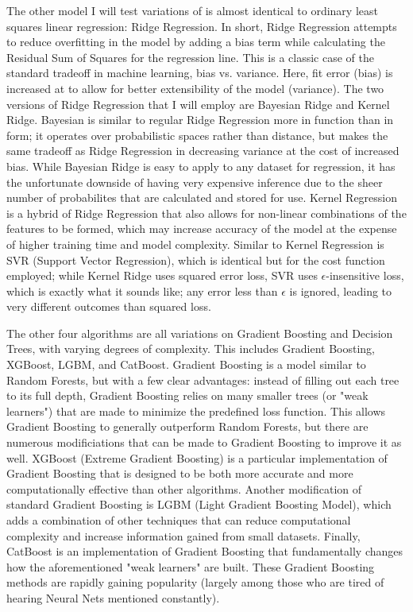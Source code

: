 \documentclass[fleqn,10pt]{SelfArx} %
\begin{document}
The other model I will test variations of is almost identical to ordinary least squares linear regression: Ridge Regression. In short, Ridge Regression attempts to reduce overfitting in the model by adding a bias term while calculating the Residual Sum of Squares for the regression line. This is a classic case of the standard tradeoff in machine learning, bias vs. variance. Here, fit error (bias) is increased at to allow for better extensibility of the model (variance). The two versions of Ridge Regression that I will employ are Bayesian Ridge and Kernel Ridge. Bayesian is similar to regular Ridge Regression more in function than in form; it operates over probabilistic spaces rather than distance, but makes the same tradeoff as Ridge Regression in decreasing variance at the cost of increased bias. While Bayesian Ridge is easy to apply to any dataset for regression, it has the unfortunate downside of having very expensive inference due to the sheer number of probabilites that are calculated and stored for use. Kernel Regression is a hybrid of Ridge Regression that also allows for non-linear combinations of the features to be formed, which may increase accuracy of the model at the expense of higher training time and model complexity. Similar to Kernel Regression is SVR (Support Vector Regression), which is identical but for the cost function employed; while Kernel Ridge uses squared error loss, SVR uses $\epsilon$-insensitive loss, which is exactly what it sounds like; any error less than $\epsilon$ is ignored, leading to very different outcomes than squared loss.

The other four algorithms are all variations on Gradient Boosting and Decision Trees, with varying degrees of complexity. This includes Gradient Boosting, XGBoost, LGBM, and CatBoost. Gradient Boosting is a model similar to Random Forests, but with a few clear advantages: instead of filling out each tree to its full depth, Gradient Boosting relies on many smaller trees (or "weak learners") that are made to minimize the predefined loss function. This allows Gradient Boosting to generally outperform Random Forests, but there are numerous modificiations that can be made to Gradient Boosting to improve it as well. XGBoost (Extreme Gradient Boosting) is a particular implementation of Gradient Boosting that is designed to be both more accurate and more computationally effective than other algorithms. Another modification of standard Gradient Boosting is LGBM (Light Gradient Boosting Model), which adds a combination of other techniques that can reduce computational complexity and increase information gained from small datasets. Finally, CatBoost is an implementation of Gradient Boosting that fundamentally changes how the aforementioned "weak learners" are built. These Gradient Boosting methods are rapidly gaining popularity (largely among those who are tired of hearing Neural Nets mentioned constantly).
\end{document}
